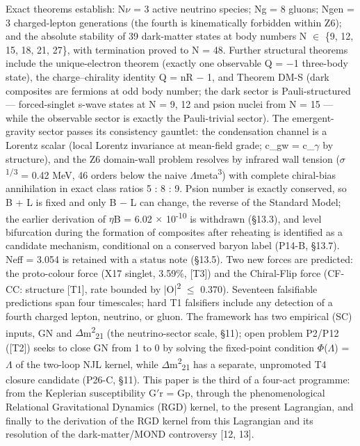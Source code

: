 \documentclass[11pt,letterpaper]{article}
\begin{document}
\noindent Exact theorems establish: N$\nu$ = 3 active neutrino species; Ng = 8 gluons; Ngen = 3 charged-lepton generations (the fourth is kinematically forbidden within Z6); and the absolute stability of 39 dark-matter states at body numbers N $\in$ \{9, 12, 15, 18, 21, 27\}, with termination proved to N = 48. Further structural theorems include the unique-electron theorem (exactly one observable Q = $-$1 three-body state), the charge--chirality identity Q = nR $-$ 1, and Theorem DM-S (dark composites are fermions at odd body number; the dark sector is Pauli-structured --- forced-singlet s-wave states at N = 9, 12 and psion nuclei from N = 15 --- while the observable sector is exactly the Pauli-trivial sector). The emergent-gravity sector passes its consistency gauntlet: the condensation channel is a Lorentz scalar (local Lorentz invariance at mean-field grade; c\_gw = c\_$\gamma$ by structure), and the Z6 domain-wall problem resolves by infrared wall tension ($\sigma$\textsuperscript{1/3} = 0.42 MeV, 46 orders below the naive $\Lambda$meta\textsuperscript{3}) with complete chiral-bias annihilation in exact class ratios 5 : 8 : 9. Psion number is exactly conserved, so B + L is fixed and only B $-$ L can change, the reverse of the Standard Model; the earlier derivation of $\eta$B = 6.02 $\times$ 10\textsuperscript{-10} is withdrawn (§13.3), and level bifurcation during the formation of composites after reheating is identified as a candidate mechanism, conditional on a conserved baryon label (P14-B, §13.7). Neff = 3.054 is retained with a status note (§13.5). Two new forces are predicted: the proto-colour force (X17 singlet, 3.59\%, [T3]) and the Chiral-Flip force (CF-CC: structure [T1], rate bounded by |O|\textsuperscript{2} $\le$ 0.370). Seventeen falsifiable predictions span four timescales; hard T1 falsifiers include any detection of a fourth charged lepton, neutrino, or gluon. The framework has two empirical (SC) inputs, GN and $\Delta$m\textsuperscript{2}\textsubscript{21} (the neutrino-sector scale, §11); open problem P2/P12 ([T2]) seeks to close GN from 1 to 0 by solving the fixed-point condition $\Phi$($\Lambda$) = $\Lambda$ of the two-loop NJL kernel, while $\Delta$m\textsuperscript{2}\textsubscript{21} has a separate, unpromoted T4 closure candidate (P26-C, §11). This paper is the third of a four-act programme: from the Keplerian susceptibility G$'$r = Gp, through the phenomenological Relational Gravitational Dynamics (RGD) kernel, to the present Lagrangian, and finally to the derivation of the RGD kernel from this Lagrangian and its resolution of the dark-matter/MOND controversy [12, 13].
\end{document}
